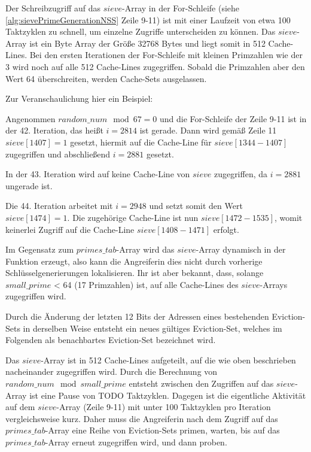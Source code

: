 Der Schreibzugriff auf das $sieve$-Array in der For-Schleife (siehe \ref{alg:sievePrimeGenerationNSS} Zeile 9-11) ist mit einer Laufzeit von etwa 100 Taktzyklen zu schnell, um einzelne Zugriffe unterscheiden zu können.
Das $sieve$-Array ist ein Byte Array der Größe 32768 Bytes und liegt somit in 512 Cache-Lines.
Bei den ersten Iterationen der For-Schleife mit kleinen Primzahlen wie der 3 wird noch auf alle 512 Cache-Lines zugegriffen.
Sobald die Primzahlen aber den Wert 64 überschreiten, werden Cache-Sets ausgelassen.

Zur Veranschaulichung hier ein Beispiel:

Angenommen $random\_num \mod 67 = 0$ und die For-Schleife der Zeile 9-11 ist in der 42. Iteration, das heißt $i=2814$ ist gerade.
Dann wird gemäß Zeile 11 $sieve[1407] = 1$ gesetzt, hiermit auf die Cache-Line für $sieve[1344-1407]$ zugegriffen und abschließend $i=2881$ gesetzt.

In der 43. Iteration wird auf keine Cache-Line von $sieve$ zugegriffen, da $i=2881$ ungerade ist.

Die 44. Iteration arbeitet mit $i=2948$ und setzt somit den Wert $sieve[1474] = 1$.
Die zugehörige Cache-Line ist nun $sieve[1472-1535]$, womit keinerlei Zugriff auf die Cache-Line $sieve[1408-1471]$ erfolgt.

Im Gegensatz zum $primes\_tab$-Array wird das $sieve$-Array dynamisch in der Funktion erzeugt, also kann die Angreiferin dies nicht durch vorherige Schlüsselgenerierungen lokalisieren.
Ihr ist aber bekannt, dass, solange $small\_prime$ < 64 (17 Primzahlen) ist, auf alle Cache-Lines des $sieve$-Arrays zugegriffen wird.

Durch die Änderung der letzten 12 Bits der Adressen eines bestehenden Eviction-Sets in derselben Weise entsteht ein neues gültiges Eviction-Set, welches im Folgenden als benachbartes Eviction-Set bezeichnet wird.

Das $sieve$-Array ist in 512 Cache-Lines aufgeteilt, auf die wie oben beschrieben nacheinander zugegriffen wird.
Durch die Berechnung von $random\_num \mod small\_prime$ entsteht zwischen den Zugriffen auf das $sieve$-Array ist eine Pause von TODO Taktzyklen.
Dagegen ist die eigentliche Aktivität auf dem $sieve$-Array (Zeile 9-11) mit unter 100 Taktzyklen pro Iteration vergleichsweise kurz.
Daher muss die Angreiferin nach dem Zugriff auf das $primes\_tab$-Array eine Reihe von Eviction-Sets primen, warten, bis auf das $primes\_tab$-Array erneut zugegriffen wird, und dann proben.

